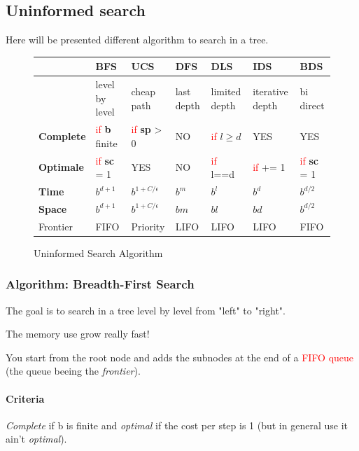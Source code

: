 \subsection{Uninformed search}
Here will be presented different algorithm to search in a tree.

\begin{figure}[h]
\centering
\begin{tabular}{|l|m{2cm}|m{2cm}|m{2cm}|m{2cm}|m{2cm}|m{2cm}|}
\hline
& \textbf{BFS} & \textbf{UCS} & \textbf{DFS} & \textbf{DLS} & \textbf{IDS} & \textbf {BDS}\\
\hline
& level by level & cheap path & last depth & limited depth & iterative depth & bi direct  \\

\hline
\hline
\textbf{Complete} & \textcolor{red}{if} \textbf{b} finite & \textcolor{red}{if} \textbf{sp} > 0  & NO  & \textcolor{red}{if} $l\geq d$ & YES & YES\\
\hline
\textbf{Optimale} & \textcolor{red}{if} \textbf{sc} = 1 & YES & NO & \textcolor{red}{if} l==d & \textcolor{red}{if} += 1 & \textcolor{red}{if} \textbf{sc} = 1 \\
\hline
\textbf{Time} & $b^{d+1}$    & $b^{1 + C/\epsilon}$ & $b^m$ & $b^l$ & $b^d$ & $b^{d/2}$\\
\hline
\textbf{Space} & $b^{d+1}$ & $b^{1 + C/\epsilon}$ & $bm$ & $bl$ & $bd$ & $b^{d/2}$ \\
\hline
Frontier & FIFO & Priority & LIFO & LIFO & LIFO & FIFO \\
\hline

\end{tabular}
\caption{Uninformed Search Algorithm}
\end{figure}


\subsubsection{Algorithm: Breadth-First Search}
The goal is to search in a tree level by level from "left" to "right".

The memory use grow really fast! 

You start from the root node and adds the subnodes at the end of a 
\textcolor{red}{FIFO queue} (the queue beeing the \textit{frontier}). 

\paragraph{Criteria} \textit{Complete} if b is finite and \textit{optimal} if the cost per
step is 1 (but in general use it ain't \textit{optimal}).


